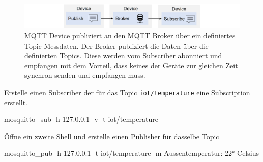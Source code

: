 \documentclass[
  11pt,
  a4paperpaper,
  oneside, openany  ,captions=tableheading
]{scrbook}
\newenvironment{Shaded}{\begin{snugshade}}{\end{snugshade}}
\newcommand{\AttributeTok}[1]{\textcolor[rgb]{0.40,0.45,0.13}{#1}}
\newcommand{\ExtensionTok}[1]{\textcolor[rgb]{0.00,0.23,0.31}{#1}}
\newcommand{\NormalTok}[1]{\textcolor[rgb]{0.00,0.23,0.31}{#1}}
\newcommand{\StringTok}[1]{\textcolor[rgb]{0.13,0.47,0.30}{#1}}
\theoremstyle{definition}
\theoremstyle{remark}
\begin{document}
\begin{figure}[H]

{\centering \includegraphics{images/mqtt-publish-subscribe.jpg}

}

\caption{MQTT Device publiziert an den MQTT Broker über ein definiertes
Topic Messdaten. Der Broker publiziert die Daten über die definierten
Topics. Diese werden vom Subscriber abonniert und empfangen mit dem
Vorteil, dass keines der Geräte zur gleichen Zeit synchron senden und
empfangen muss.}

\end{figure}%

Erstelle einen Subscriber der für das Topic \texttt{iot/temperature}
eine Subscription erstellt.

\begin{Shaded}
\begin{Highlighting}[]
\ExtensionTok{mosquitto\_sub} \AttributeTok{{-}h}\NormalTok{ 127.0.0.1 }\AttributeTok{{-}v} \AttributeTok{{-}t} \StringTok{\textquotesingle{}iot/temperature\textquotesingle{}}
\end{Highlighting}
\end{Shaded}

Öffne ein zweite Shell und erstelle einen Publisher für dasselbe Topic

\begin{Shaded}
\begin{Highlighting}[]
\ExtensionTok{mosquitto\_pub} \AttributeTok{{-}h}\NormalTok{ 127.0.0.1 }\AttributeTok{{-}t} \StringTok{\textquotesingle{}iot/temperature\textquotesingle{}} \AttributeTok{{-}m} \StringTok{\textquotesingle{}Aussentemperatur: 22° Celsius\textquotesingle{}}
\end{Highlighting}
\end{Shaded}
\end{document}
